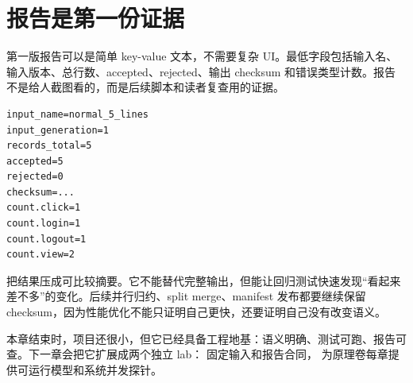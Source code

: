 \section{报告是第一份证据}

第一版报告可以是简单 key-value 文本，不需要复杂 UI。最低字段包括输入名、输入版本、总行数、accepted、rejected、输出 checksum 和错误类型计数。报告不是给人截图看的，而是后续脚本和读者复查用的证据。

\begin{lstlisting}[numbers=none,caption={第一版报告示例}]
input_name=normal_5_lines
input_generation=1
records_total=5
accepted=5
rejected=0
checksum=...
count.click=1
count.login=1
count.logout=1
count.view=2
\end{lstlisting}

 把结果压成可比较摘要。它不能替代完整输出，但能让回归测试快速发现“看起来差不多”的变化。后续并行归约、split merge、manifest 发布都要继续保留 checksum，因为性能优化不能只证明自己更快，还要证明自己没有改变语义。

本章结束时，项目还很小，但它已经具备工程地基：语义明确、测试可跑、报告可查。下一章会把它扩展成两个独立 lab： 固定输入和报告合同， 为原理卷每章提供可运行模型和系统并发探针。
